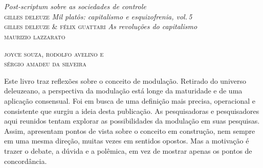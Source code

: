 \chapter*{}

\vspace*{\fill}

\thispagestyle{empty}

\setlength{\epigraphwidth}{.75\textwidth}
\begin{epigraphs} 

{\textit{Post-scriptum sobre as sociedades de controle}\\\textsc{gilles deleuze}}
\bigskip
{}
{\emph{Mil platôs: capitalismo e esquizofrenia, vol.\,5}\\\textsc{gilles deleuze \& félix guattari}}
\bigskip
{}
{\emph{As revoluções do capitalismo}\\\textsc{maurizio lazzarato}}

\end{epigraphs}



\begin{flushright}
\textsc{joyce souza, rodolfo avelino e\\sérgio amadeu da silveira}
\end{flushright}

\noindent{}Este livro traz reflexões sobre o conceito de modulação. Retirado do
universo deleuzeano, a perspectiva da modulação está longe da maturidade
e de uma aplicação consensual. Foi em busca de uma definição mais
precisa, operacional e consistente que surgiu a ideia desta publicação.
As pesquisadoras e pesquisadores aqui reunidos tentam explorar as
possibilidades da modulação em suas pesquisas. Assim, apresentam pontos
de vista sobre o conceito em construção, nem sempre em uma mesma
direção, muitas vezes em sentidos opostos. Mas a motivação é trazer o
debate, a dúvida e a polêmica, em vez de mostrar apenas os pontos de
concordância.

